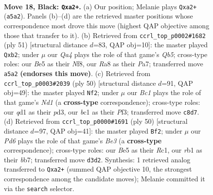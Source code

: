 \documentclass[11pt]{article}
\begin{document}
\clearpage

\begin{figure}[p]\centering
\begin{subfigure}{0.46\textwidth}\centering
\resizebox{\linewidth}{!}{%
\newchessgame
\chessboard[
  setfen={rnb1k3/pp6/6p1/q3b1P1/8/3p4/P4K2/1RBQ1BN1 b q - 1 18},
  showmover=false,
  pgfstyle=straightmove, color=movearrow, markmove={a5-a2}
]}
\caption{}
\end{subfigure}\hfill
\begin{subfigure}{0.46\textwidth}\centering
\resizebox{\linewidth}{!}{%
\newchessgame
\chessboard[
  setfen={3k1n2/pb3p2/4p3/4P3/1qp3Q1/2N5/1P2BPP1/4K3 b - - 0 26},
  showmover=false,
  pgfstyle=straightmove, color=movearrow, markmove={b4-b2}
]}
\caption{}
\end{subfigure}
\\[4pt]
\begin{subfigure}{0.46\textwidth}\centering
\resizebox{\linewidth}{!}{%
\newchessgame
\chessboard[
  setfen={1r5b/4qk2/2Q1p3/p5p1/8/3p1P2/PP4P1/R2N1K2 w - - 0 26},
  showmover=false,
  pgfstyle=straightmove, color=movearrow, markmove={d1-f2}
]}
\caption{}
\end{subfigure}\hfill
\begin{subfigure}{0.46\textwidth}\centering
\resizebox{\linewidth}{!}{%
\newchessgame
\chessboard[
  setfen={r5k1/1b2qppp/3b4/3P4/5P2/3QBBP1/7P/2R3K1 w - - 1 26},
  showmover=false,
  pgfstyle=straightmove, color=movearrow, markmove={e3-f2}
]}
\caption{}
\end{subfigure}
\caption{\textbf{Move 18, Black: \texttt{Qxa2+}.} (a) Our position; Melanie plays \texttt{Qxa2+} (\texttt{a5a2}). Panels (b)--(d) are the retrieved master positions whose correspondence most drove this move (highest QAP objective among those that transfer to it). (b) Retrieved from \texttt{ccrl\_top\_p0002\#1682} (ply 51) [structural distance $d$=83, QAP obj=10]: the master played \texttt{Qxb2}; under $\mu$ our \emph{Qa4} plays the role of that game's \emph{Qb5}; cross-type roles: our \emph{B}e5 as their \emph{N}f8, our \emph{R}a8 as their \emph{P}a7; transferred move \texttt{a5a2} \textbf{(endorses this move)}. (c) Retrieved from \texttt{ccrl\_top\_p0003\#2039} (ply 50) [structural distance $d$=91, QAP obj=49]: the master played \texttt{Nf2}; under $\mu$ our \emph{Bc1} plays the role of that game's \emph{Nd1} (a \textbf{cross-type} correspondence); cross-type roles: our \emph{q}d1 as their \emph{p}d3, our \emph{b}c1 as their \emph{P}f3; transferred move \texttt{c8d7}. (d) Retrieved from \texttt{ccrl\_top\_p0000\#1691} (ply 50) [structural distance $d$=97, QAP obj=41]: the master played \texttt{Bf2}; under $\mu$ our \emph{Pd6} plays the role of that game's \emph{Be3} (a \textbf{cross-type} correspondence); cross-type roles: our \emph{B}e5 as their \emph{R}c1, our \emph{r}b1 as their \emph{b}b7; transferred move \texttt{d3d2}. Synthesis: 1 retrieved analog transferred to \texttt{Qxa2+} (summed QAP objective 10, the strongest correspondence among the candidate moves); Melanie committed it via the \texttt{search} selector.}
\label{fig:thought-m35}
\end{figure}
\end{document}
